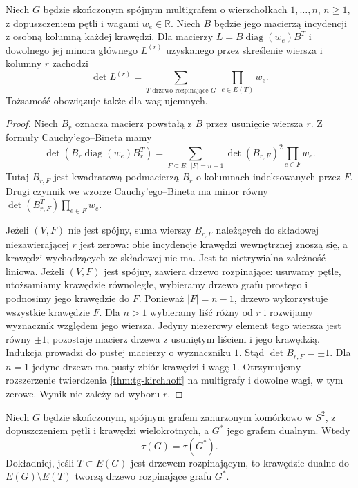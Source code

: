 \begin{stwierdzenie}
\label{prop:tg-tait-signed-tree}
Niech $G$ będzie skończonym spójnym multigrafem
o wierzchołkach $1,\ldots,n$, $n\geq1$, z dopuszczeniem
pętli i wagami $w_e\in\mathbb R$. Niech $B$ będzie
jego macierzą incydencji z osobną kolumną każdej krawędzi.
Dla macierzy $L=B\operatorname{diag}(w_e)B^T$
i dowolnego jej minora głównego $L^{(r)}$
uzyskanego przez skreślenie wiersza i kolumny $r$
zachodzi
\[
\det L^{(r)}=\sum_{T\text{ drzewo rozpinające }G}
\ \prod_{e\in E(T)}w_e.
\]
Tożsamość obowiązuje także dla wag ujemnych.
\end{stwierdzenie}
\begin{proof}
Niech $B_r$ oznacza macierz powstałą z $B$ przez
usunięcie wiersza $r$. Z formuły Cauchy'ego--Bineta
mamy
\[
\det(B_r\operatorname{diag}(w_e)B_r^T)
=\sum_{F\subseteq E,\ |F|=n-1}
\det(B_{r,F})^2\prod_{e\in F}w_e.
\]
Tutaj $B_{r,F}$ jest kwadratową podmacierzą $B_r$
o kolumnach indeksowanych przez $F$. Drugi czynnik
we wzorze Cauchy'ego--Bineta ma minor równy
$\det(B_{r,F}^T)\prod_{e\in F}w_e$.

Jeżeli $(V,F)$ nie jest spójny, suma wierszy
$B_{r,F}$ należących do składowej niezawierającej $r$
jest zerowa: obie incydencje krawędzi wewnętrznej
znoszą się, a krawędzi wychodzących ze składowej
nie ma. Jest to nietrywialna zależność liniowa.
Jeżeli $(V,F)$ jest spójny, zawiera drzewo rozpinające:
usuwamy pętle, utożsamiamy krawędzie równoległe,
wybieramy drzewo grafu prostego i podnosimy jego
krawędzie do $F$. Ponieważ $|F|=n-1$, drzewo
wykorzystuje wszystkie krawędzie $F$.
Dla $n>1$ wybieramy liść różny od $r$ i rozwijamy
wyznacznik względem jego wiersza. Jedyny niezerowy
element tego wiersza jest równy $\pm1$; pozostaje
macierz drzewa z usuniętym liściem i jego krawędzią.
Indukcja prowadzi do pustej macierzy o wyznaczniku $1$.
Stąd $\det B_{r,F}=\pm1$. Dla $n=1$ jedyne drzewo
ma pusty zbiór krawędzi i wagę $1$.
Otrzymujemy rozszerzenie twierdzenia
\ref{thm:tg-kirchhoff} na multigrafy i dowolne wagi,
w tym zerowe. Wynik nie zależy od wyboru $r$.
\end{proof}

\begin{stwierdzenie}
\label{thm:tg-tait-dual-trees}
Niech $G$ będzie skończonym, spójnym grafem
zanurzonym komórkowo w $S^2$, z dopuszczeniem
pętli i krawędzi wielokrotnych, a $G^*$
jego grafem dualnym. Wtedy
\[
\tau(G)=\tau(G^*).
\]
Dokładniej, jeśli $T\subset E(G)$ jest drzewem
rozpinającym, to krawędzie dualne do
$E(G)\setminus E(T)$ tworzą drzewo rozpinające
grafu $G^*$.
\end{stwierdzenie}


